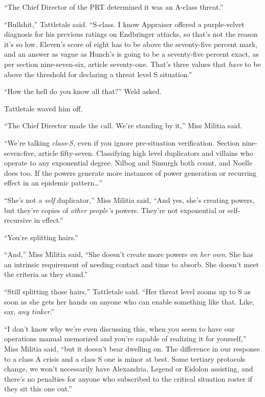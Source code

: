 ``The Chief Director of the PRT determined it was an A-class threat.''



``Bullshit,'' Tattletale said.  ``S-class.  I know Appraiser offered a purple-velvet diagnosis for his previous ratings on Endbringer attacks, so that's not the reason it's so low.  Eleven's score of eight has to be above the seventy-five percent mark, and an answer as vague as Hunch's is going to be a seventy-five percent exact, as per section nine-seven-six, article seventy-one.  That's three values that \emph{have} to be above the threshold for declaring a threat level S situation.''



``How the hell do you know all that?'' Weld asked.



Tattletale waved him off.



``The Chief Director made the call.  We're standing by it,'' Miss Militia said.



``We're talking \emph{class-S, }even if you ignore pre-situation verification.  Section nine-seven-five, article fifty-seven.  Classifying high level duplicators and villains who operate to any exponential degree.  Nilbog and Simurgh both count, and Noelle does too.  If the powers generate more instances of power generation or recurring effect in an epidemic pattern\ldots''



``She's not a \emph{self} duplicator,'' Miss Militia said, ``And yes, she's creating powers, but they're copies of \emph{other people's }powers.  They're not exponential or self-recursive in effect.''



``You're splitting hairs.''



``And,'' Miss Militia said, ``She doesn't create more powers \emph{on her own}.  She has an intrinsic requirement of needing contact and time to absorb.  She doesn't meet the criteria as they stand.''



``Still splitting those hairs,'' Tattletale said.  ``Her threat level zooms up to S as soon as she gets her hands on anyone who can enable something like that.  Like, say, \emph{any tinker}.''



``I don't know why we're even discussing this, when you seem to have our operations manual memorized and you're capable of realizing it for yourself,'' Miss Militia said, ``but it doesn't bear dwelling on.  The difference in our response to a class A crisis and a class S one is minor at best.  Some tertiary protocols change, we won't necessarily have Alexandria, Legend or Eidolon assisting, and there's no penalties for anyone who subscribed to the critical situation roster if they sit this one out.''



